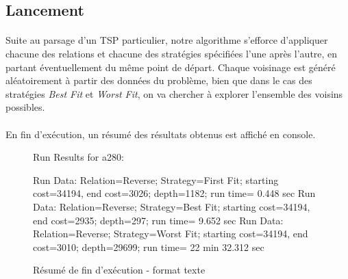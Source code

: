 \documentclass[a4paper,10pt]{report}
\begin{document}
\subsection{Lancement}

\paragraph{}
  Suite au parsage d'un TSP particulier, notre algorithme s'efforce d'appliquer
chacune des relations et chacune des stratégies spécifiées l'une après l'autre,
en partant éventuellement du même point de départ. Chaque voisinage est généré
aléatoirement à partir des données du problème, bien que dans le cas des
stratégies \textit{Best Fit} et \textit{Worst Fit}, on va chercher à explorer
l'ensemble des voisins possibles.

\paragraph{}
En fin d'exécution, un résumé des résultats obtenus est affiché en console.

\begin{figure}[h]
Run Results for a280:
 \begin{center}
Run Data: Relation=Reverse;	Strategy=First Fit;	starting cost=34194,
  end cost=3026;	depth=1182;	run time= 0.448 sec\linebreak
Run Data: Relation=Reverse;	Strategy=Best Fit;	starting cost=34194,
  end cost=2935;	depth=297;	run time= 9.652 sec\linebreak
Run Data: Relation=Reverse;	Strategy=Worst Fit;	starting cost=34194,
  end cost=3010;	depth=29699;	run time= 22 min 32.312 sec\linebreak
 \end{center}
  \label{a280-sample-results}
  \caption{Résumé de fin d'exécution - format texte}
\end{figure}
\end{document}
